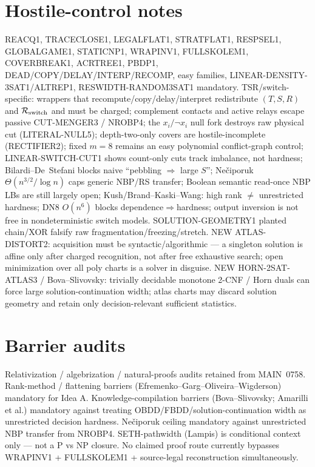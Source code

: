 \documentclass[11pt]{article}
\begin{document}
\section*{Hostile-control notes}
REACQ1, TRACECLOSE1, LEGALFLAT1, STRATFLAT1, RESPSEL1, GLOBALGAME1, STATICNP1, WRAPINV1,
FULLSKOLEM1, COVERBREAK1, ACRTREE1, PBDP1, DEAD/COPY/DELAY/INTERP/RECOMP, easy families,
LINEAR-DENSITY-3SAT1/ALTREP1, RESWIDTH-RANDOM3SAT1 mandatory.
TSR/switch-specific: wrappers that recompute/copy/delay/interpret redistribute $(T,S,R)$ and
$\mathcal R_{\rm switch}$ and must be charged; complement contacts and active relays escape
passive CUT-MENGER3 / NROBP4; the $x_i/\neg x_i$ null fork destroys raw physical cut
(LITERAL-NULL5); depth-two-only covers are hostile-incomplete (RECTIFIER2);
fixed $m=8$ remains an easy polynomial conflict-graph control;
LINEAR-SWITCH-CUT1 shows count-only cuts track imbalance, not hardness;
Bilardi--De~Stefani blocks naive ``pebbling $\Rightarrow$ large $S$'';
Ne\v{c}iporuk $\Theta(n^{3/2}/\log n)$ caps generic NBP/RS transfer;
Boolean semantic read-once NBP LBs are still largely open;
Kush/Brand--Kaski--Wang: high rank $\neq$ unrestricted hardness;
DN8 $O(n^6)$ blocks dependence$\Rightarrow$hardness;
output inversion is not free in nondeterministic switch models.
SOLUTION-GEOMETRY1 planted chain/XOR falsify raw fragmentation/freezing/stretch.
NEW ATLAS-DISTORT2: acquisition must be syntactic/algorithmic --- a singleton solution
is affine only after charged recognition, not after free exhaustive search;
open minimization over all poly charts is a solver in disguise.
NEW HORN-2SAT-ATLAS3 / Bova--Slivovsky: trivially decidable monotone 2-CNF / Horn duals
can force large solution-continuation width; atlas charts may discard solution geometry
and retain only decision-relevant sufficient statistics.

\section*{Barrier audits}
Relativization / algebrization / natural-proofs audits retained from MAIN~0758.
Rank-method / flattening barriers (Efremenko--Garg--Oliveira--Wigderson) mandatory for
Idea A.
Knowledge-compilation barriers (Bova--Slivovsky; Amarilli et al.) mandatory against
treating OBDD/FBDD/solution-continuation width as unrestricted decision hardness.
Ne\v{c}iporuk ceiling mandatory against unrestricted NBP transfer from NROBP4.
SETH-pathwidth (Lampis) is conditional context only --- not a P vs NP closure.
No claimed proof route currently bypasses WRAPINV1 + FULLSKOLEM1 + source-legal
reconstruction simultaneously.
\end{document}
